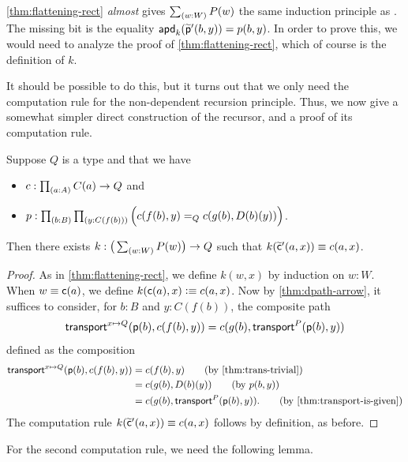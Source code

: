 \cref{thm:flattening-rect} \emph{almost} gives $\sm{w:W}P(w)$ the same induction principle as \Wtil.
The missing bit is the equality $\mathsf{apd}_{k}(\widetilde{\mathsf{p}}'(b,y)) = p(b,y)$.
In order to prove this, we would need to analyze the proof of \cref{thm:flattening-rect}, which of course is the definition of $k$.

It should be possible to do this, but it turns out that we only need the computation rule for the non-dependent recursion principle.
Thus, we now give a somewhat simpler direct construction of the recursor, and a proof of its computation rule.

\begin{lem}\label{thm:flattening-rectnd}
  Suppose $Q$ is a type and that we have
  \begin{itemize}
  \item $c : \prd{a:A} C(a) \to Q$ and
  \item $p : \prd{b:B}{y:C(f(b))} \Big(c(f(b),y) =_Q c(g(b),D(b)(y))\Big)$.
  \end{itemize}
  Then there exists $k:\big(\sm{w:W} P(w)\big) \to Q$ such that $k(\widetilde{\mathsf{c}}'(a,x)) \equiv c(a,x)$.
\end{lem}
\begin{proof}
  As in \cref{thm:flattening-rect}, we define $k(w,x)$ by induction on $w:W$.
  When $w\equiv \mathsf{c}(a)$, we define $k(\mathsf{c}(a),x)\vcentcolon\equiv c(a,x)$.
  Now by \cref{thm:dpath-arrow}, it suffices to consider, for $b:B$ and $y:C(f(b))$, the composite path
  \begin{equation}\label{eq:flattening-rectnd}
    \mathsf{transport}^{x\mapsto Q}(\mathsf{p}(b),c(f(b),y))
    = c(g(b),\mathsf{transport}^{P}(\mathsf{p}(b),y))
  \end{equation}
  defined as the composition
  \begin{align}
    \transfib{x\mapsto Q}{\pp(b)}{c(f(b),y)}
    &= c(f(b),y) \tag{by \cref{thm:trans-trivial}}\\
    &= c(g(b),D(b)(y)) \tag{by $p(b,y)$}\\
    &= c(g(b),\transfib{P}{\pp(b)}{y}). \tag{by \cref{thm:transport-is-given}}
  \end{align}
  The computation rule $k(\widetilde{\mathsf{c}}'(a,x)) \equiv c(a,x)$ follows by definition, as before.
\end{proof}

For the second computation rule, we need the following lemma.

